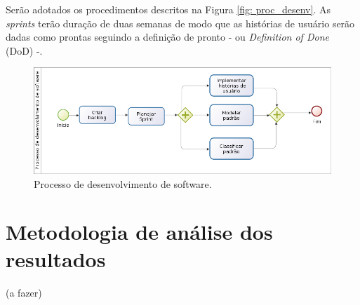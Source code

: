 Serão adotados os procedimentos descritos na Figura \ref{fig: proc_desenv}. As \textit{sprints} terão duração de duas semanas de modo que as histórias de usuário serão dadas como prontas seguindo a definição de pronto - ou \textit{Definition of Done} (DoD) -.

\begin{figure}[!htb]
    \centering
    \includegraphics[scale=0.5]{figuras/processo_desenvolvimento.png}
    \caption{Processo de desenvolvimento de software.} 
    \label{fig:proc_desenv}
\end{figure}

\pagebreak

\section{Metodologia de análise dos resultados}

(a fazer)



